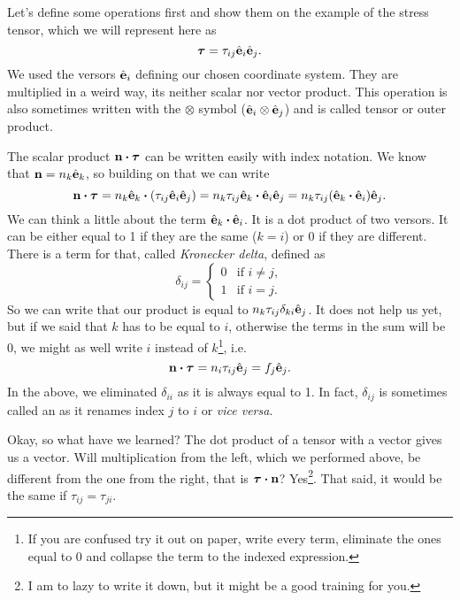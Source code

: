 \documentclass{article}
\begin{document}
Let's define some operations first and show them on the example of the stress 
tensor, which we will represent here as
\[
  \bm{\tau} = \tau_{ij}\hat{\vb{e}}_i \hat{\vb{e}}_j.
\]
We used the versors \(\hat{\vb{e}}_i\) defining our chosen coordinate system. 
They are multiplied in a weird way, its neither scalar nor vector product. This 
operation is also sometimes written with 
the \(\otimes\) symbol (\(\hat{\vb{e}}_i \otimes \hat{\vb{e}}_j\)) and 
is called tensor or outer product.

The scalar product \(\vb{n}\dotproduct\bm{\tau}\) can be written easily 
with index notation. We know that \(\vb{n} = n_k \hat{\vb{e}}_k\), so 
building on that we can write
\[
  \vb{n}\dotproduct\bm{\tau} 
  = n_k \hat{\vb{e}}_k \dotproduct \qty(\tau_{ij}\hat{\vb{e}}_i \hat{\vb{e}}_j)
  = n_k \tau_{ij} \hat{\vb{e}}_k \dotproduct \hat{\vb{e}}_i \hat{\vb{e}}_j 
  = n_k \tau_{ij} \qty(\hat{\vb{e}}_k \dotproduct \hat{\vb{e}}_i) \hat{\vb{e}}_j.
\]
We can think a little about the term \(\hat{\vb{e}}_k \dotproduct \hat{\vb{e}}_i\).
It is a dot product of two versors. It can be either equal to 1 if they are 
the same (\(k=i\)) or 0 if they are different. There is a term for that, called
\emph{Kronecker delta}, defined as
\[
  \delta_{ij} = \begin{cases}
0 &\text{if } i \neq j,   \\
1 &\text{if } i=j.   \end{cases}
\]
So we can write that our product is equal to 
\(n_k \tau_{ij}\delta_{ki} \hat{\vb{e}}_j \). It does not help us yet, but if 
we said that \(k\) has to be equal to \(i\), otherwise the terms in the sum 
will be 0, we might as well write \(i\) instead of \(k\)\footnote{If you are 
confused try it out on paper, write every term, eliminate the ones equal to 0
and collapse the term to the indexed expression.}, i.e.\
\[
  \vb{n}\dotproduct\bm{\tau} = n_i \tau_{ij} \hat{\vb{e}}_j = f_j \hat{\vb{e}}_j.
\]
In the above, we eliminated \(\delta_{ii}\) as it is always equal to 1. In fact,
\(\delta_{ij}\) is sometimes called an \say{index renamer} as it renames index 
\(j\) to \(i\) or \textit{vice versa}.

Okay, so what have we learned? The dot product of a tensor with a vector gives 
us a vector. Will multiplication from the left, which we performed above, be 
different from the one from the right, that is \(\bm{\tau}\dotproduct\vb{n}\)?
Yes\footnote{I am to lazy to write it down, but it might be a good training
for you.}. That said, it would be the same if \(\tau_{ij} = \tau_{ji}\).
\end{document}
